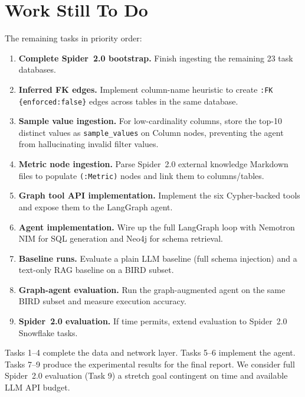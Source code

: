 \documentclass[11pt]{article}
\begin{document}
\section{Work Still To Do}

The remaining tasks in priority order:

\begin{enumerate}[leftmargin=*]
  \item \textbf{Complete Spider~2.0 bootstrap.} Finish ingesting the remaining 23 task databases.
  \item \textbf{Inferred FK edges.} Implement column-name heuristic to create \texttt{:FK \{enforced:false\}} edges across tables in the same database.
  \item \textbf{Sample value ingestion.} For low-cardinality columns, store the top-10 distinct values as \texttt{sample\_values} on Column nodes, preventing the agent from hallucinating invalid filter values.
  \item \textbf{Metric node ingestion.} Parse Spider~2.0 external knowledge Markdown files to populate \texttt{(:Metric)} nodes and link them to columns/tables.
  \item \textbf{Graph tool API implementation.} Implement the six Cypher-backed tools and expose them to the LangGraph agent.
  \item \textbf{Agent implementation.} Wire up the full LangGraph loop with Nemotron NIM for SQL generation and Neo4j for schema retrieval.
  \item \textbf{Baseline runs.} Evaluate a plain LLM baseline (full schema injection) and a text-only RAG baseline on a BIRD subset.
  \item \textbf{Graph-agent evaluation.} Run the graph-augmented agent on the same BIRD subset and measure execution accuracy.
  \item \textbf{Spider~2.0 evaluation.} If time permits, extend evaluation to Spider~2.0 Snowflake tasks.
\end{enumerate}

Tasks 1--4 complete the data and network layer.
Tasks 5--6 implement the agent.
Tasks 7--9 produce the experimental results for the final report.
We consider full Spider~2.0 evaluation (Task 9) a stretch goal contingent on time and available LLM API budget.
\end{document}
